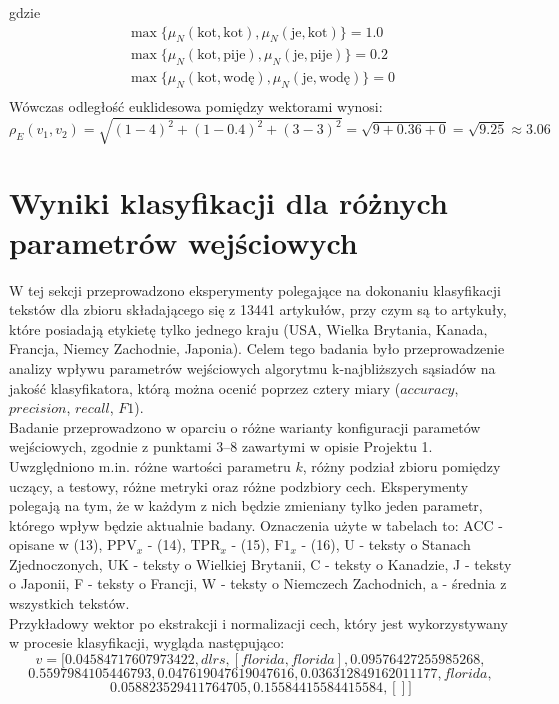 \documentclass{article}
\begin{document}
gdzie
\[
\begin{aligned}
\max \{\mu_N(\text{kot}, \text{kot}), \mu_N(\text{je}, \text{kot})\} = 1.0 \\
\max \{\mu_N(\text{kot}, \text{pije}), \mu_N(\text{je}, \text{pije})\} = 0.2 \\
\max \{\mu_N(\text{kot}, \text{wodę}), \mu_N(\text{je}, \text{wodę})\} = 0 \\
\end{aligned}
\]
Wówczas odległość euklidesowa pomiędzy wektorami wynosi:
\[
\rho_E(v_1, v_2) = \sqrt{(1 - 4)^2 + (1 - 0.4)^2 + (3 - 3)^2} = \sqrt{9 + 0.36 + 0} = \sqrt{9.25} \approx 3.06
\]

\section{Wyniki klasyfikacji dla różnych parametrów wejściowych}
W tej sekcji przeprowadzono eksperymenty polegające na dokonaniu klasyfikacji tekstów dla zbioru składającego się z 13441 artykułów, przy czym są to artykuły, które posiadają etykietę tylko jednego kraju (USA, Wielka Brytania, Kanada, Francja, Niemcy Zachodnie, Japonia). Celem tego badania było przeprowadzenie analizy wpływu parametrów wejściowych algorytmu k-najbliższych sąsiadów na jakość klasyfikatora, którą można ocenić poprzez cztery miary (\(accuracy\), \(precision\), \(recall\), \(F1\)). \\
Badanie przeprowadzono w oparciu o różne warianty konfiguracji parametów wejściowych, zgodnie z punktami 3–8 zawartymi w opisie Projektu 1. Uwzględniono m.in. różne wartości parametru \(k\), różny podział zbioru pomiędzy uczący, a testowy, różne metryki oraz różne podzbiory cech. Eksperymenty polegają na tym, że w każdym z nich będzie zmieniany tylko jeden parametr, którego wpływ będzie aktualnie badany.
Oznaczenia użyte w tabelach to: ACC - opisane w (13),  \( \text{PPV}_x \) - (14), \( \text{TPR}_x \) - (15), \( \text{F1}_x \) - (16), U - teksty o Stanach Zjednoczonych, UK - teksty o Wielkiej Brytanii, C - teksty o Kanadzie, J - teksty o Japonii, F - teksty o Francji, W - teksty o Niemczech Zachodnich, a - średnia z wszystkich tekstów.
\\
Przykładowy wektor po ekstrakcji i normalizacji cech, który jest wykorzystywany w procesie klasyfikacji, wygląda następująco:
\[
    v = [ 0.04584717607973422, dlrs, [ florida, florida], 0.09576427255985268,
\]
\[
     0.5597984105446793, 0.047619047619047616, 0.036312849162011177, florida,
\]
\[
     0.058823529411764705, 0.15584415584415584, [] ]
\]
\end{document}
